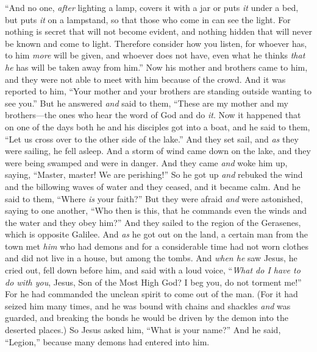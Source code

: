\begin{biblechapter}
 “And no one, \textit{after} lighting a lamp, covers it with a jar or puts \textit{it} under a bed, but puts \textit{it} on a lampstand, so that those who come in can see the light.
\verse For nothing is secret that will not become evident, and nothing hidden that will never be known and come to light.
\verse Therefore consider how you listen, for whoever has, to him \textit{more} will be given, and whoever does not have, even what he thinks \textit{that he} has will be taken away from him.”
 Now his mother and brothers came to him, and they were not able to meet with him because of the crowd.
\verse And it was reported to him, “Your mother and your brothers are standing outside wanting to see you.”
\verse But he answered \textit{and} said to them, “These are my mother and my brothers—the ones who hear the word of God and do \textit{it}.
 Now it happened that on one of the days both he and his disciples got into a boat, and he said to them, “Let us cross over to the other side of the lake.” And they set sail,
\verse and \textit{as} they were sailing, he fell asleep. And a storm of wind came down on the lake, and they were being swamped and were in danger.
\verse And they came \textit{and} woke him up, saying, “Master, master! We are perishing!” So he got up \textit{and} rebuked the wind and the billowing waves of water and they ceased, and it became calm.
\verse And he said to them, “Where \textit{is} your faith?” But they were afraid \textit{and} were astonished, saying to one another, “Who then is this, that he commands even the winds and the water and they obey him?”
 And they sailed to the region of the Gerasenes, which is opposite Galilee.
\verse And \textit{as} he got out on the land, a certain man from the town met \textit{him} who had demons and for a considerable time had not worn clothes and did not live in a house, but among the tombs.
\verse And \textit{when he} saw Jesus, he cried out, fell down before him, and said with a loud voice, “\textit{What do I have to do with you}, Jesus, Son of the Most High God? I beg you, do not torment me!”
\verse For he had commanded the unclean spirit to come out of the man. (For it had seized him many times, and he was bound with chains and shackles \textit{and} was guarded, and breaking the bonds he would be driven by the demon into the deserted places.)
\verse So Jesus asked him, “What is your name?” And he said, “Legion,” because many demons had entered into him.

\end{biblechapter}
